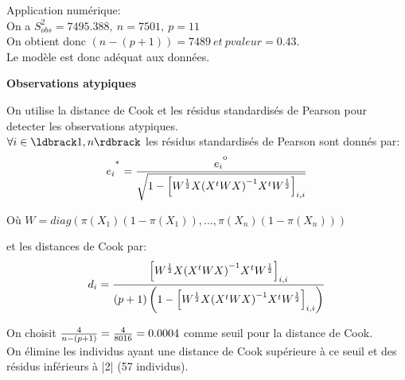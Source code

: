 \documentclass{book}
\begin{document}
\noindent
Application numérique:\\

\noindent
On a $S^2_{obs} = 7495.388,~ n = 7501,~ p = 11$\\

\noindent
On obtient donc $\left(n-\left(p+1\right)\right) = 7489 ~et~ pvaleur = 0.43$.\\

\noindent
Le modèle est donc adéquat aux données.\\

\bigskip

\noindent
\textbf{Observations atypiques}

\bigskip

\noindent
On utilise la distance de Cook et les résidus standardisés de Pearson pour detecter les observations atypiques.\\
$\forall i \in \ldbrack 1,n \rdbrack$ les résidus standardisés de Pearson sont donnés par:\\
\begin{align*}
{e_i}^{\textsuperscript{*}} = { 
{{e_i}^\textsuperscript{o}} 
 \over
{\sqrt{1 - \left[ W^{1 \over 2}X {\left( X^t WX \right)}^{-1} X^t W^{1 \over 2} \right]_{i,i}   }}
        }
\end{align*}

Où $W = diag \left(
\pi\left(X_1\right) \left(1- \pi\left(X_1\right)\right)
,...,
\pi\left(X_n\right) \left(1- \pi\left(X_n\right)\right)
\right)$
\bigskip




\noindent 
et les distances de Cook par:\\
\begin{align*}
d_i = 
{{\left[W^{1 \over 2} X {\left(X^t WX \right) }^{-1} X^tW^{1 \over 2} \right]_{i,i}} 
\over 
{  \left( p+1 \right) \left( 1 - {\left[ W^{1 \over 2} X {\left(X^t WX \right) }^{-1} X^t W^{1 \over 2} \right]_{i,i}} \right)     }}
\end{align*}



\noindent
On choisit ${4 \over {n - \left( p+1 \right)} }= {4 \over 8016} = 0.0004$ comme seuil pour la distance de Cook.\\
On élimine les individus ayant une distance de Cook supérieure à ce seuil et des résidus inférieurs à |2| (57 individus).\\
\end{document}
